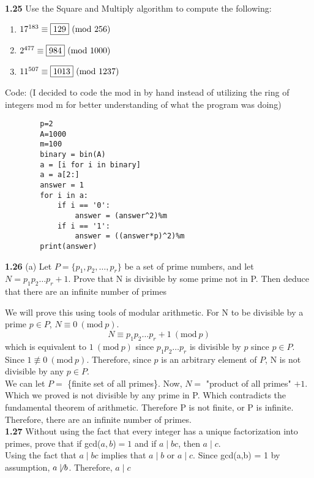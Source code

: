 \documentclass[a4paper, 11pt]{article}
\newcommand{\Mod}[1]{\ (\mathrm{mod}\ #1)}
\begin{document}
\noindent\textbf{1.25}
    Use the Square and Multiply algorithm to compute the following:
    \begin{enumerate}[label=(\alph*)]
        \item $17^{183} \equiv \fbox{129} \Mod{256}$
        \item $2^{477} \equiv \fbox{984} \Mod{1000}$
        \item $11^{507} \equiv \fbox{1013} \Mod{1237}$
    \end{enumerate}
    Code: (I decided to code the mod in by hand instead of utilizing the ring of integers mod m for better understanding of what the program was doing)
    \singlespacing
    \begin{lstlisting}
        p=2
        A=1000
        m=100
        binary = bin(A)
        a = [i for i in binary]
        a = a[2:]
        answer = 1
        for i in a:
            if i == '0':
                answer = (answer^2)%m
            if i == '1':
                answer = ((answer*p)^2)%m
        print(answer)
    \end{lstlisting} 
    \doublespacing
\noindent\textbf{1.26} (a)
    Let $P = \{ p_1,p_2,\dots ,p_r\}$ be a set of prime numbers, and let $N = p_1p_2\dots p_r + 1$. Prove that N is divisible by some prime not in P. Then deduce that there are an infinite number of primes
    
    We will prove this using tools of modular arithmetic. For N to be divisible by a prime $p\in P$, $N \equiv 0 \Mod{p}$. 
    $$N\equiv p_1p_2\dots p_r + 1 \Mod{p}$$
    which is equivalent to $1 \Mod{p}$ since $p_1p_2\dots p_r$ is divisible by $p$ since $p\in P$. Since $1 \not\equiv 0 \Mod{p}$. Therefore, since $p$ is an arbitrary element of $P$, N is not divisible by any $p\in P$.\\
    
    We can let $P =$ \{finite set of all primes\}. Now, $N= $ "product of all primes" $+ 1$. Which we proved is not divisible by any prime in P. Which contradicts the fundamental theorem of arithmetic. Therefore P is not finite, or P is infinite. Therefore, there are an infinite number of primes.\\
    

\noindent\textbf{1.27}
    Without using the fact that every integer has a unique factorization into primes, prove that if gcd($a,b$)$=1$ and if $a\mid bc$, then $a\mid c$.\\
    
    Using the fact that $a \mid bc$ implies that $a \mid b$ or $a \mid c$. Since gcd(a,b) = 1 by assumption, $a \not\mid b$. Therefore, $a \mid c$
\end{document}
